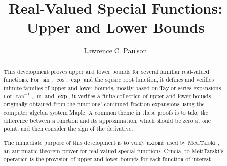 \documentclass[11pt,a4paper]{report}
\begin{document}
\title{Real-Valued Special Functions: \\ 
       Upper and Lower Bounds}
\author{Lawrence C. Paulson}
\maketitle

\begin{abstract}
This development proves upper and lower bounds for several familiar real-valued functions. For $\sin$, $\cos$, $\exp$ and the square root function, it defines and verifies infinite families of upper and lower bounds, mostly based on Taylor series expansions. For $\tan^{-1}$, $\ln$ and $\exp$, it verifies a finite collection of upper and lower bounds, originally obtained from the functions' continued fraction expansions using the computer algebra system Maple. A common theme in these proofs is to take the difference between a function and its approximation, which should be zero at one point, and then consider the sign of the derivative.

The immediate purpose of this development is to verify axioms used by MetiTarski \cite{metitarski-jar}, an automatic theorem prover for real-valued special functions. Crucial to MetiTarski's operation is the provision of upper and lower bounds for each function of interest.
\end{abstract}

\tableofcontents





\end{document}
